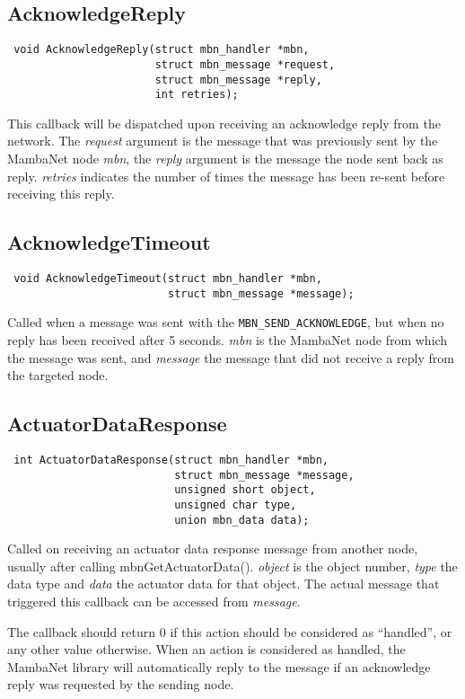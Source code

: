 \subsection{AcknowledgeReply}
\begin{verbatim}
 void AcknowledgeReply(struct mbn_handler *mbn,
                       struct mbn_message *request,
                       struct mbn_message *reply,
                       int retries);
\end{verbatim}
This callback will be dispatched upon receiving an acknowledge reply from the network. The \textit{request} argument is the message that was previously sent by the MambaNet node \textit{mbn}, the \textit{reply} argument is the message the node sent back as reply. \textit{retries} indicates the number of times the message has been re-sent before receiving this reply.


\subsection{AcknowledgeTimeout}
\begin{verbatim}
 void AcknowledgeTimeout(struct mbn_handler *mbn,
                         struct mbn_message *message);
\end{verbatim}
Called when a message was sent with the \verb|MBN_SEND_ACKNOWLEDGE|, but when no reply has been received after 5 seconds. \textit{mbn} is the MambaNet node from which the message was sent, and \textit{message} the message that did not receive a reply from the targeted node.


\subsection{ActuatorDataResponse}
\begin{verbatim}
 int ActuatorDataResponse(struct mbn_handler *mbn,
                          struct mbn_message *message,
                          unsigned short object,
                          unsigned char type,
                          union mbn_data data);
\end{verbatim}
Called on receiving an actuator data response message from another node, usually after calling mbnGetActuatorData(). \textit{object} is the object number, \textit{type} the data type and \textit{data} the actuator data for that object. The actual message that triggered this callback can be accessed from \textit{message}.

The callback should return 0 if this action should be considered as ``handled'', or any other value otherwise. When an action is considered as handled, the MambaNet library will automatically reply to the message if an acknowledge reply was requested by the sending node.


